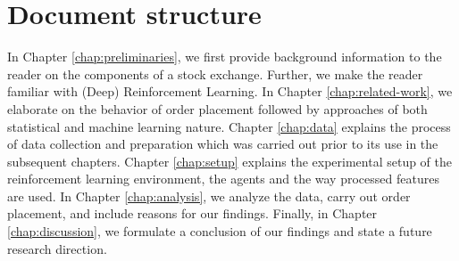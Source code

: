 \section{Document structure}

In Chapter \ref{chap:preliminaries}, we first provide background information to the reader on the components of a stock exchange. %
Further, we make the reader familiar with (Deep) Reinforcement Learning.
In Chapter \ref{chap:related-work}, we elaborate on the behavior of order placement followed by approaches of both statistical and machine learning nature.
Chapter \ref{chap:data} explains the process of data collection and preparation which was carried out prior to its use in the subsequent chapters.
Chapter \ref{chap:setup} explains the experimental setup of the reinforcement learning environment, the agents and the way processed features are used.
In Chapter \ref{chap:analysis}, we analyze the data, carry out order placement, and include reasons for our findings.
Finally, in Chapter \ref{chap:discussion}, we formulate a conclusion of our findings and state a future research direction.
